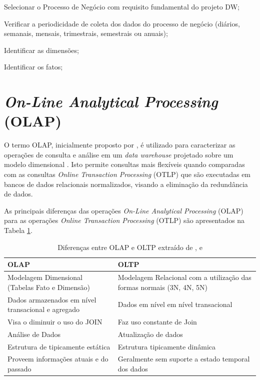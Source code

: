\begin{inparaenum}[1)]
	\item Selecionar o Processo de Negócio com requisito fundamental do 
	projeto DW;
	
	\item Verificar a periodicidade de coleta dos dados do processo de negócio (diários, semanais, mensais, trimestrais, semestrais ou anuais);
	
	\item Identificar as dimensões;
	
	\item Identificar os fatos;

\end{inparaenum} 


\section{\textit{On-Line Analytical Processing} (OLAP)}

O termo OLAP, inicialmente proposto por , é utilizado para caracterizar as operações de consulta e análise em um \textit{data warehouse} projetado sobre um modelo dimensional \cite{Kimball2002}. Isto permite consultas mais flexíveis quando comparadas com as consultas \textit{Online Transaction Processing} (OTLP) que são executadas em bancos de dados relacionais normalizados, visando a eliminação da redundância de dados.

As principais diferenças das operações \textit{On-Line Analytical Processing} (OLAP) para as operações 
\textit{Online Transaction Processing} (OTLP) são apresentados na Tabela 
\ref{olapxoltp}.

	\begin{table}[!ht]
	\begin{center}
	 \begin{tabular}{|p{5cm}|p{5cm}|}
		\hline
		OLAP & OLTP \\ \hline
		Modelagem Dimensional (Tabelas Fato e Dimensão) & Modelagem Relacional com a utilização das formas normais (3N, 4N, 5N) \\ \hline
		Dados armazenados em nível transacional e agregado    & Dados em nível em nível transacional        \\ \hline
		Visa o diminuir o uso do JOIN & Faz uso constante de Join   \\ \hline
		Análise de Dados & Atualização de dados
		\\ \hline
		Estrutura de tipicamente estática  & Estrutura tipicamente dinâmica      \\ \hline
		Proveem informações atuais e do passado & Geralmente sem suporte a estado temporal dos dados
		      \\ \hline

		\end{tabular}
		\caption{Diferenças entre OLAP e OLTP extraído de ,  e }
		\label{olapxoltp}
		\end{center}
		\end{table}
		\FloatBarrier

